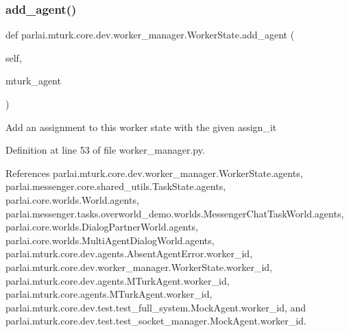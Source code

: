 \mbox{\label{classparlai_1_1mturk_1_1core_1_1dev_1_1worker__manager_1_1WorkerState_a36a49c3444954cb32d3500c834dd8f6a}} 
\subsubsection{\texorpdfstring{add\+\_\+agent()}{add\_agent()}}
{\footnotesize\ttfamily def parlai.\+mturk.\+core.\+dev.\+worker\+\_\+manager.\+Worker\+State.\+add\+\_\+agent (\begin{DoxyParamCaption}\item[{}]{self,  }\item[{}]{mturk\+\_\+agent }\end{DoxyParamCaption})}

\begin{DoxyVerb}Add an assignment to this worker state with the given assign_it\end{DoxyVerb}
 

Definition at line 53 of file worker\+\_\+manager.\+py.



References parlai.\+mturk.\+core.\+dev.\+worker\+\_\+manager.\+Worker\+State.\+agents, parlai.\+messenger.\+core.\+shared\+\_\+utils.\+Task\+State.\+agents, parlai.\+core.\+worlds.\+World.\+agents, parlai.\+messenger.\+tasks.\+overworld\+\_\+demo.\+worlds.\+Messenger\+Chat\+Task\+World.\+agents, parlai.\+core.\+worlds.\+Dialog\+Partner\+World.\+agents, parlai.\+core.\+worlds.\+Multi\+Agent\+Dialog\+World.\+agents, parlai.\+mturk.\+core.\+dev.\+agents.\+Absent\+Agent\+Error.\+worker\+\_\+id, parlai.\+mturk.\+core.\+dev.\+worker\+\_\+manager.\+Worker\+State.\+worker\+\_\+id, parlai.\+mturk.\+core.\+dev.\+agents.\+M\+Turk\+Agent.\+worker\+\_\+id, parlai.\+mturk.\+core.\+agents.\+M\+Turk\+Agent.\+worker\+\_\+id, parlai.\+mturk.\+core.\+dev.\+test.\+test\+\_\+full\+\_\+system.\+Mock\+Agent.\+worker\+\_\+id, and parlai.\+mturk.\+core.\+dev.\+test.\+test\+\_\+socket\+\_\+manager.\+Mock\+Agent.\+worker\+\_\+id.

\mbox{\label{classparlai_1_1mturk_1_1core_1_1dev_1_1worker__manager_1_1WorkerState_af8edaccdc36152c54f0a4083edcad3b3}} 
